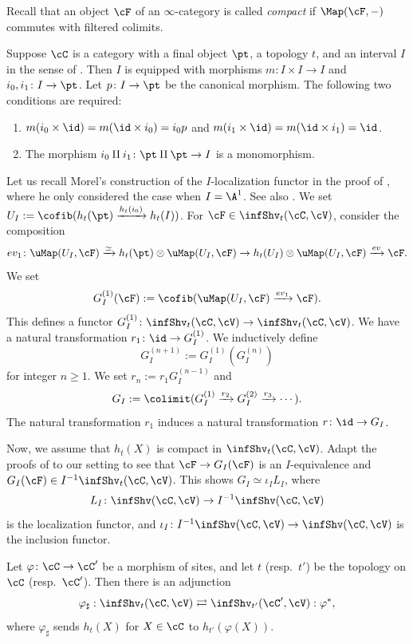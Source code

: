 \documentclass[10pt]{amsart}
\begin{document}
Recall that an object $\cF$ of an $\infty$-category is called \emph{compact} if $\Map(\cF,-)$ commutes with filtered colimits.

\begin{const}
Suppose $\cC$ is a category with a final object $\pt$, a topology $t$, and an interval $I$ in the sense of \cite[Section 2.3]{MV}.
Then $I$ is equipped with morphisms $m\colon I\times I\to I$ and $i_0,i_1\colon I\to \pt$.
Let $p\colon I\to \pt$ be the canonical morphism.
The following two conditions are required:
\begin{enumerate}
\item[(i)] $m(i_0\times \id)=m(\id\times i_0)=i_0p$ and $m(i_1\times \id)=m(\id \times i_1)=\id$.
\item[(ii)] The morphism $i_0\amalg i_1\colon \pt \amalg \pt \to I$ is a monomorphism.
\end{enumerate}

Let us recall Morel's construction of the $I$-localization functor in the proof of \cite[Theorem 4.2.1]{zbMATH05052895}, where he only considered the case when $I=\A^1$.
See also \cite[Section 5.2.c]{CD19}.
We set $U_I:=\cofib(h_t(\pt)\xrightarrow{h_t(i_0)} h_t(I))$.
For $\cF\in \infShv_t(\cC,\cV)$, consider the composition
\[
ev_1\colon \uMap(U_I,\cF) \xrightarrow{\simeq} h_t(\pt) \otimes \uMap(U_I,\cF) \to h_t(U_I) \otimes \uMap(U_I,\cF) \xrightarrow{ev} \cF.
\]
We set
\[
G_{I}^{(1)}(\cF)
:=
\cofib(\uMap(U_I,\cF)\xrightarrow{ev_1} \cF).
\]
This defines a functor $G_{I}^{(1)}\colon \infShv_t(\cC,\cV)\to \infShv_t(\cC,\cV)$.
We have a natural transformation $r_1\colon \id \to G_{I}^{(1)}$.
We inductively define
\[
G_{I}^{(n+1)}:=G_{I}^{(1)}(G_{I}^{(n)})
\]
for integer $n\geq 1$.
We set $r_n:=r_1 G_I^{(n-1)}$ and
\[
G_{I}:=\colimit(G_{I}^{(1)}\xrightarrow{r_2} G_{I}^{(2)} \xrightarrow{r_3} \cdots ).
\]
The natural transformation $r_1$ induces a natural transformation $r\colon \id \to G_{I}$.

Now, we assume that $h_t(X)$ is compact in $\infShv_t(\cC,\cV)$.
Adapt the proofs of \cite[Lemma 5.2.27, Proposition 5.2.28]{CD19} to our setting to see that $\cF\to G_I(\cF)$ is an $I$-equivalence and $G_I(\cF)\in I^{-1}\infShv_t(\cC,\cV)$.
This shows $G_{I}\simeq \iota_I L_{I}$, where 
\[
L_I
\colon
\infShv(\cC,\cV) \to I^{-1}\infShv(\cC,\cV)
\]
is the localization functor, and $\iota_I\colon I^{-1}\infShv(\cC,\cV)\to \infShv(\cC,\cV)$ is the inclusion functor.
\end{const}

Let $\varphi\colon \cC\to \cC'$ be a morphism of sites, and let $t$ (resp.\ $t'$) be the topology on $\cC$ (resp.\ $\cC'$).
Then there is an adjunction
\begin{equation}
\varphi_\sharp : \infShv_t(\cC,\cV)\rightleftarrows \infShv_{t'}(\cC',\cV) : \varphi^*,
\end{equation}
where $\varphi_\sharp$ sends $h_t(X)$ for $X\in \cC$ to $h_{t'}(\varphi(X))$.
\end{document}
